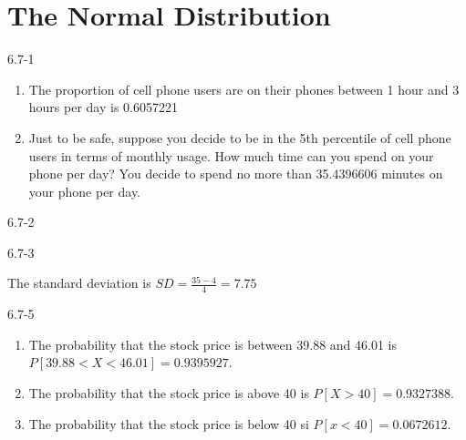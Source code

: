 \setcounter{chapter}{5}\chapter{The Normal Distribution}
\begin{exsol@solution}{6.7-1}

\begin{enumerate}
	\item The proportion of cell phone users are on their phones between 1 hour
and 3 hours per day is 0.6057221
  \item Just to be safe, suppose you decide to be in the 5th percentile of
cell phone users in terms of monthly usage.  How much time can you spend on your phone per day? You decide to spend no more than 35.4396606 minutes on your phone per day.
	\end{enumerate}
\end{exsol@solution}
\begin{exsol@solution}{6.7-2}
%

\end{exsol@solution}
\begin{exsol@solution}{6.7-3}


    The standard deviation is $SD = \frac{35 - 4}{4} = 7.75$
\end{exsol@solution}
\begin{exsol@solution}{6.7-5}

\begin{enumerate}
\item The probability that the stock price is between 39.88 and 46.01 is $P[39.88 < X < 46.01] = 0.9395927$.
\item The probability that the stock price is above 40 is $P[X > 40] = 0.9327388$.
\item The probability that the stock price is below 40 si $P[ x < 40] = 0.0672612$.
\end{enumerate}
\end{exsol@solution}
